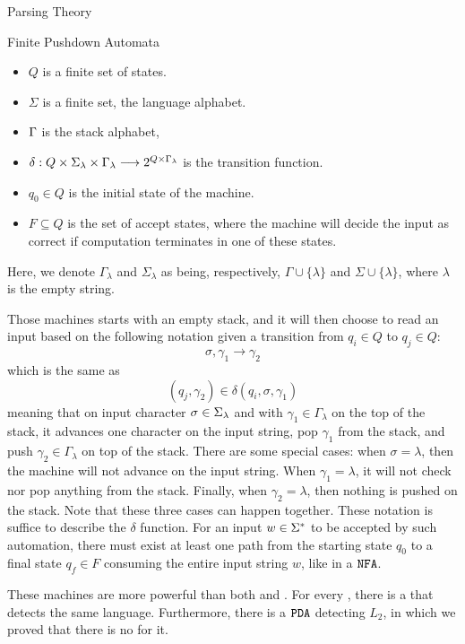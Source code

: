 \begin{section}{Parsing Theory}
\begin{subsection}{Finite Pushdown Automata}
\begin{definition}
\begin{itemize}
\item $Q$ is a finite set of states.
\item $\Sigma$ is a finite set, the language alphabet.
\item $\Gamma$ is the stack alphabet,
\item $\delta:Q\times\Sigma_\lambda \times \Gamma_\lambda \longrightarrow 2^{Q \times \Gamma_\lambda}$ is the transition function.
\item $q_0 \in Q$ is the initial state of the machine.
\item $F \subseteq Q$ is the set of accept states, where the machine will
decide the input as correct if computation terminates in one of these
states.
\end{itemize}
\end{definition}
Here, we denote $\Gamma_\lambda$ and $\Sigma_\lambda$ as being, respectively,
$\Gamma \cup \{\lambda\}$ and $\Sigma \cup \{\lambda\}$, where $\lambda$ is
the empty string.

Those machines starts with an empty stack, and it will then choose
to read an input based on the following notation given a transition from $q_i \in Q$
to $q_j \in Q$:
$$\sigma, \gamma_1 \rightarrow \gamma_2$$
which is the same as
$$(q_j, \gamma_2) \in \delta(q_i, \sigma, \gamma_1)$$
meaning that on input character $\sigma \in \Sigma_\lambda$ and with $\gamma_1 \in
\Gamma_\lambda$ on the top of the stack, it advances one character on the input
string, pop $\gamma_1$ from the stack, and push $\gamma_2 \in \Gamma_\lambda$
on top of the stack. There are some special cases: when $\sigma = \lambda$,
then the machine will not advance on the input string. When $\gamma_1 =
\lambda$, it will not check nor pop anything from the stack. Finally, when
$\gamma_2 = \lambda$, then nothing is pushed on the stack. Note that these
three cases can happen together. These notation is suffice to describe the
$\delta$ function.  For an input $w \in \Sigma^*$ to be accepted by such
automation, there must exist at least one path from the starting state $q_0$ to
a final state $q_f \in F$ consuming the entire input string $w$, like in
a $\texttt{NFA}$.

These machines are more powerful than both  and .
For every , there is a  that detects the same language.
Furthermore, there is a $\texttt{PDA}$ detecting $L_2$, in
which we proved that there is no  for it.

\begin{figure}
\end{figure}
\end{subsection}
\end{section}
